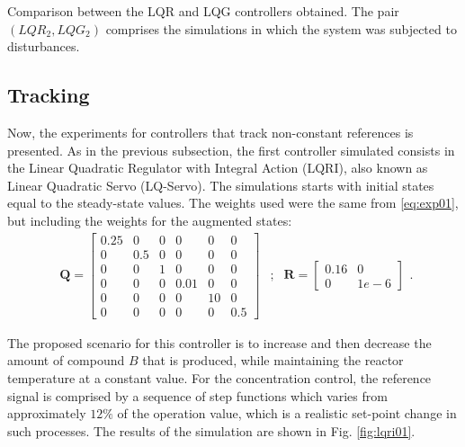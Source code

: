 \documentclass[a4paper,11pt]{book}
\numberwithin{figure}{chapter}
\numberwithin{equation}{chapter}
\numberwithin{table}{chapter}
\theoremstyle{definition}
\begin{document}
\begin{table}[ht]
	\caption{Comparison between the LQR and LQG controllers obtained. The pair $(LQR_2, LQG_2)$ comprises the simulations in which the system was subjected to disturbances.}
	\label{tb:lqrMetrics}
\end{table}

\subsection{Tracking}

Now, the experiments for controllers that track non-constant references is presented. As in the previous subsection, the first controller simulated consists in the Linear Quadratic Regulator with Integral Action (LQRI), also known as Linear Quadratic Servo (LQ-Servo). The simulations starts with initial states equal to the steady-state values. The weights used were the same from \eqref{eq:exp01}, but including the weights for the augmented states: 
\begin{equation}
\begin{matrix}
   \bm{Q} = \begin{bmatrix} 0.25 & 0 & 0 & 0 & 0 & 0 \\ 0 & 0.5 & 0 & 0 & 0 & 0 \\ 0 & 0 & 1 & 0 & 0 & 0\\ 0 & 0 & 0 & 0.01 & 0 & 0 \\ 0 & 0 & 0 & 0 & 10 & 0 \\ 0 & 0 & 0 & 0 & 0 & 0.5 \end{bmatrix} &; & \bm{R} = \begin{bmatrix} 0.16 & 0 \\ 0 & 1e-6 \end{bmatrix}
\end{matrix}
.\end{equation} 

The proposed scenario for this controller is to increase and then decrease the amount of compound $B$ that is produced, while maintaining the reactor temperature at a constant value. For the concentration control, the reference signal is comprised by a sequence of step functions which varies from approximately $12\%$ of the operation value, which is a realistic set-point change in such processes. The results of the simulation are shown in Fig. \ref{fig:lqri01}.
\end{document}

